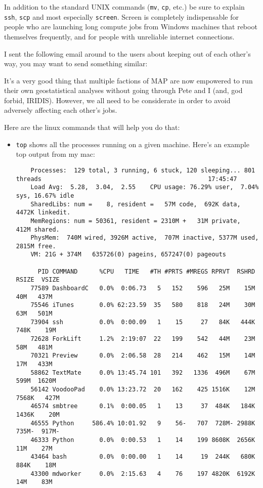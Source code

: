 In addition to the standard UNIX commands (\texttt{mv}, \texttt{cp}, etc.) be sure to explain \texttt{ssh}, \texttt{scp} and most especially \texttt{screen}. Screen is completely indispensable for people who are launching long compute jobs from Windows machines that reboot themselves frequently, and for people with unreliable internet connections.

I sent the following email around to the users about keeping out of each other's way, you may want to send something similar:

\bigskip
{\sffamily

It's a very good thing that multiple factions of MAP are now empowered to run their own geostatistical analyses without going through Pete and I (and, god forbid, IRIDIS). However, we all need to be considerate in order to avoid adversely affecting each other's jobs.


Here are the linux commands that will help you do that:

\begin{itemize}
    \item \texttt{top} shows all the processes running on a given machine. Here's an example top output from my mac:

    \begin{verbatim}
    Processes:  129 total, 3 running, 6 stuck, 120 sleeping... 801 threads                                              17:45:47
    Load Avg:  5.28,  3.04,  2.55    CPU usage: 76.29% user,  7.04% sys, 16.67% idle
    SharedLibs: num =    8, resident =   57M code,  692K data, 4472K linkedit.
    MemRegions: num = 50361, resident = 2310M +   31M private,  412M shared.
    PhysMem:  740M wired, 3926M active,  707M inactive, 5377M used, 2815M free.
    VM: 21G + 374M   635726(0) pageins, 657247(0) pageouts

      PID COMMAND      %CPU   TIME   #TH #PRTS #MREGS RPRVT  RSHRD  RSIZE  VSIZE
    77589 DashboardC   0.0%  0:06.73   5   152    596   25M    15M    40M   437M 
    75546 iTunes       0.0% 62:23.59  35   580    818   24M    30M    63M   501M 
    73904 ssh          0.0%  0:00.09   1    15     27   84K   444K   748K    19M 
    72628 ForkLift     1.2%  2:19:07  22   199    542   44M    23M    58M   481M 
    70321 Preview      0.0%  2:06.58  28   214    462   15M    14M    17M   433M 
    58862 TextMate     0.0% 13:45.74 101   392   1336  496M    67M   599M  1620M 
    56142 VoodooPad    0.0% 13:23.72  20   162    425 1516K    12M  7568K   427M 
    46574 smbtree      0.1%  0:00.05   1    13     37  484K   184K  1436K    20M 
    46555 Python     586.4% 10:01.92   9    56-   707  728M- 2988K   735M-  917M-
    46333 Python       0.0%  0:00.53   1    14    199 8608K  2656K    11M    27M 
    43464 bash         0.0%  0:00.00   1    14     19  244K   680K   884K    18M 
    43300 mdworker     0.0%  2:15.63   4    76    197 4820K  6192K    14M    83M     
    \end{verbatim}


\end{itemize}}
